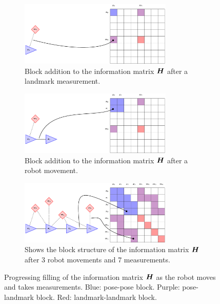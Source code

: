 \begin{figure}[htbp!]
    \newcommand{\figScale}{0.8}
    \centering
    \begin{subfigure}[htbp!]{\textwidth}
        \centering
        \includegraphics[width=\figScale\textwidth]{tikz/matrix1.pdf}
        \caption{Block addition to the information matrix $\boldsymbol{H}$ after a landmark measurement.}
        \label{fig:matrix1}
    \end{subfigure}
    \begin{subfigure}[htbp!]{\textwidth}
        \centering
        \includegraphics[width=\figScale\textwidth]{tikz/matrix2.pdf}
        \caption{Block addition to the information matrix $\boldsymbol{H}$ after a robot movement.}
        \label{fig:matrix2}
    \end{subfigure}
    \begin{subfigure}[htbp!]{\textwidth}
        \centering
        \includegraphics[width=\figScale\textwidth]{tikz/matrix3.pdf}
        \caption{Shows the block structure of the information matrix $\boldsymbol{H}$ after 3 robot movements and 7 measurements.}
        \label{fig:matrix3}
    \end{subfigure}
    \caption[Information matrix structure]{Progressing filling of the information matrix $\boldsymbol{H}$ as the robot moves and takes measurements. Blue: pose-pose block. Purple: pose-landmark block. Red: landmark-landmark block.}
    \label{fig:information-matrix}
\end{figure}

